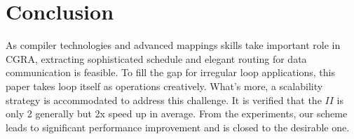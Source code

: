 \documentclass[10pt, conference, compsocconf]{IEEEtran}
\begin{document}



\section{Conclusion}
As compiler technologies and advanced mappings skills take important role in CGRA, extracting sophisticated schedule and elegant routing for data communication is feasible. To fill the gap for irregular loop applications, this paper takes loop itself as operations creatively. What's more, a scalability strategy is accommodated to address this challenge. It is verified that the $II$ is only 2 generally but 2x speed up in average. From the experiments, our scheme leads to significant performance improvement and is closed to the desirable one.










%
%

%
%
%




\end{document}

